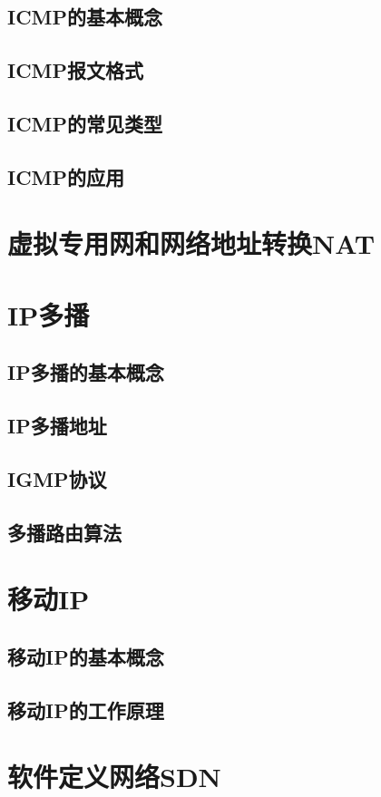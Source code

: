 \documentclass[lang=cn,newtx,10pt,scheme=chinese]{../../elegantbook}
\begin{document}
\subsection{ICMP的基本概念}
\subsection{ICMP报文格式}
\subsection{ICMP的常见类型}
\subsection{ICMP的应用}

\section{虚拟专用网和网络地址转换NAT}

\section{IP多播}
\subsection{IP多播的基本概念}
\subsection{IP多播地址}
\subsection{IGMP协议}
\subsection{多播路由算法}

\section{移动IP}
\subsection{移动IP的基本概念}
\subsection{移动IP的工作原理}

\section{软件定义网络SDN}
\end{document}
